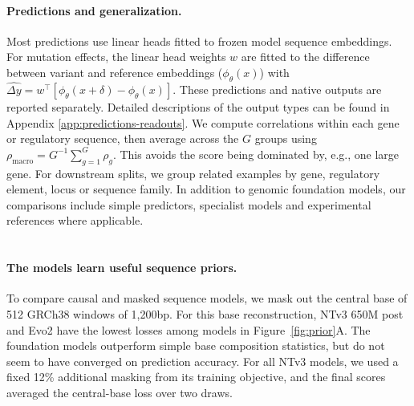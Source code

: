 \endgroup

\paragraph{Predictions and generalization.}
Most predictions use linear heads fitted to frozen model sequence embeddings. For mutation effects, the linear head weights $w$ are fitted to the difference between variant and reference embeddings ($\phi_\theta(x)$) with
$\widehat{\Delta y} =w^\top[\phi_\theta(x+\delta)-\phi_\theta(x)]$. These predictions and native outputs are reported separately. Detailed descriptions of the output types can be found in Appendix \ref{app:predictions-readouts}. We compute correlations within each gene or regulatory sequence, then average across the $G$ groups using $\rho_{\mathrm{macro}}=G^{-1}\sum_{g=1}^{G}\rho_g$. This avoids the score being dominated by, e.g., one large gene. For downstream splits, we group related examples by gene, regulatory element, locus or sequence family. In addition to genomic foundation models, our comparisons include simple predictors, specialist models and experimental references where applicable.




\section{} \label{sec:sequence-priors}

\paragraph{The models learn useful sequence priors.} To compare causal and masked sequence models, we mask out the central base of 512 GRCh38 windows of 1,200bp. For this base reconstruction, NTv3 650M post and Evo2 have the lowest losses among models in Figure~\ref{fig:prior}A. The foundation models outperform simple base composition statistics, but do not seem to have converged on prediction accuracy. For all NTv3 models, we used a fixed
12\% additional masking from its training objective, and the final scores averaged the central-base loss over two draws.

